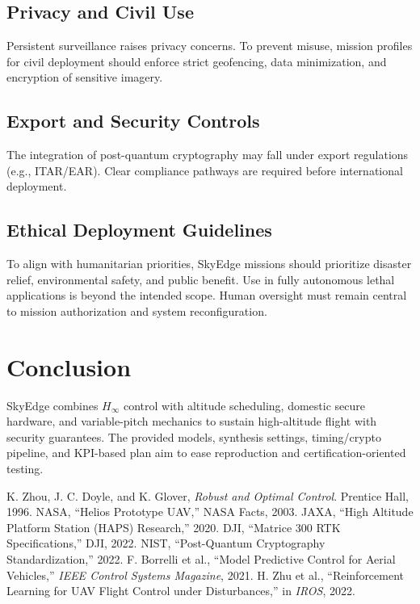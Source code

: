\documentclass[conference]{IEEEtran}
\begin{document}
\subsection{Privacy and Civil Use}
Persistent surveillance raises privacy concerns. To prevent misuse,
mission profiles for civil deployment should enforce strict geofencing,
data minimization, and encryption of sensitive imagery.  

\subsection{Export and Security Controls}
The integration of post-quantum cryptography may fall under export
regulations (e.g., ITAR/EAR). Clear compliance pathways are required
before international deployment.  

\subsection{Ethical Deployment Guidelines}
To align with humanitarian priorities, SkyEdge missions should
prioritize disaster relief, environmental safety, and public benefit.
Use in fully autonomous lethal applications is beyond the intended
scope. Human oversight must remain central to mission authorization and
system reconfiguration.  

\section{Conclusion}
SkyEdge combines $H_\infty$ control with altitude scheduling, domestic secure hardware, and variable-pitch mechanics to sustain high-altitude flight with security guarantees. The provided models, synthesis settings, timing/crypto pipeline, and KPI-based plan aim to ease reproduction and certification-oriented testing.

\balance

\begin{thebibliography}{99}
 K. Zhou, J. C. Doyle, and K. Glover, \emph{Robust and Optimal Control}. Prentice Hall, 1996.
 NASA, ``Helios Prototype UAV,'' NASA Facts, 2003.
 JAXA, ``High Altitude Platform Station (HAPS) Research,'' 2020.
 DJI, ``Matrice 300 RTK Specifications,'' DJI, 2022.
 NIST, ``Post-Quantum Cryptography Standardization,'' 2022.
 F. Borrelli et al., ``Model Predictive Control for Aerial Vehicles,'' \emph{IEEE Control Systems Magazine}, 2021.
 H. Zhu et al., ``Reinforcement Learning for UAV Flight Control under Disturbances,'' in \emph{IROS}, 2022.
\end{thebibliography}
\end{document}
